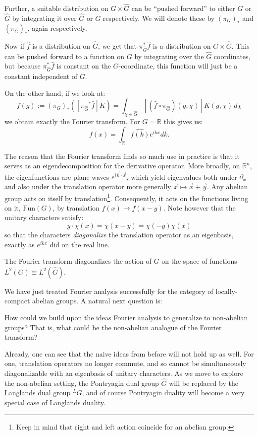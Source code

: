 Further, a suitable distribution on $G \times \hat G$ can be ``pushed forward'' to either $G$ or $\hat G$ by integrating it over $\hat G$ or $G$ respectively. We will denote these by $(\pi_G)_*$ and $(\pi_{\hat G})_*$, again respectively.

Now if $\hat f$ is a distribution on $\hat G$, we get that $\pi_{\hat G}^* \hat f$ is a distribution on $G \times \hat G$. This can be pushed forward to a function on $G$ by integrating over the $\hat G$ coordinates, but because $\pi_{\hat G}^* \hat f$ is constant on the $G$-coordinate, this function will just be a constant independent of $G$.

On the other hand, if we look at:
\begin{equation}
	f (g) := {(\pi_{G})}_* ([{\pi_{\hat G}}^* \hat f] K) = \int_{\chi \in \hat G} [(\hat f \circ \pi_{\hat G}) (g, \chi)] K(g, \chi)\, d\chi
\end{equation}
we obtain exactly the Fourier transform. For $G = \mathbb R$ this gives us:
\begin{equation}
	f(x) = \int_{\mathbb R} \widehat{f(k)} e^{ikx} dk.
\end{equation}

The reason that the Fourier transform finds so much use in practice is that it serves as an eigendecomposition for the derivative operator. More broadly, on $\mathbb R^n$, the eigenfunctions are plane waves $e^{i\vec k \cdot \vec x}$, which yield eigenvalues both under $\partial_x$ and also under the translation operator more generally $\vec x \mapsto \vec x + \vec y$. Any abelian group acts on itself by translation\footnote{Keep in mind that right and left action coincide for an abelian group.}. Consequently, it acts on the functions living on it, $\mathrm{Fun}(G)$, by translation $f(x) \to f(x - y)$. Note however that the unitary characters satisfy:
\begin{equation}
	y \cdot \chi(x) = \chi(x - y) = \chi(-y) \chi(x)
\end{equation}
so that the characters \emph{diagonalize} the translation operator as an eigenbasis, exactly as $e^{ikx}$ did on the real line.

\begin{fact}
	The Fourier transform diagonalizes the action of $G$ on the space of functions $L^2(G) \cong L^2(\hat G)$.
\end{fact}

We have just treated Fourier analysis successfully for the category of locally-compact abelian groups. A natural next question is:
\begin{ques}
	How could we build upon the ideas Fourier analysis to generalize to non-abelian groups? That is, what could be the non-abelian analogue of the Fourier transform?
\end{ques}
Already, one can see that the naive ideas from before will not hold up as well. For one, translation operators no longer commute, and so cannot be simultaneously diagonalizable with an eigenbasis of unitary characters. As we move to explore the non-abelian setting, the Pontryagin dual group $\hat G$ will be replaced by the Langlands dual group $^L G$, and of course Pontryagin duality will become a very special case of Langlands duality.

